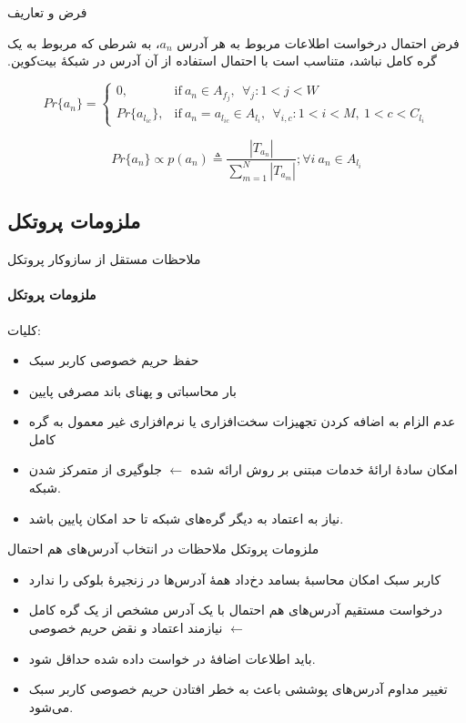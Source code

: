 \documentclass{beamer}
\begin{document}
\begin{frame}{فرض و تعاریف}
	\begin{block}{فرض}
		‫احتمال درخواست اطلاعات مربوط به هر آدرس $a_n$، به شرطی که مربوط به یک گره کامل نباشد، متناسب است با احتمال استفاده از آن آدرس در شبکهٔ بیت‌کوین.
	\end{block}

\begin{equation}
Pr\{{a_n}\} = 
\begin{cases}
0, & \text{if}\ a_n \in A_{f_j},\ \ \forall_{j} : 1<j<W \\
Pr\{{a_{l_{ic}}}\}, & \text{if}\ a_n = a_{l_{ic}} \in A_{l_i},\ \ \forall_{i,c} : 1<i<M,\  1<c<C_{l_i}
\end{cases} \label{eq:3}
\end{equation}


\begin{equation}
Pr\{{a_n}\} \propto p(a_n) \triangleq \frac{|T_{a_n}|}{\sum_{m=1}^{N}|T_{a_m}|}; \forall i \  a_n \in A_{l_i}  \label{eq:4}
\end{equation}

\end{frame}


\subsection{ملزومات پروتکل}
\begin{frame}{ملاحظات مستقل از سازوکار پروتکل}
	\framesubtitle{ملزومات پروتکل}
	کلیات:
	\begin{itemize}
		\item {حفظ حریم خصوصی کاربر سبک}
		\item {بار محاسباتی و پهنای باند مصرفی پایین}
		\item {عدم الزام به اضافه کردن تجهیزات سخت‌افزاری یا نرم‌افزاری غیر معمول به گره کامل}
		\item {
			امکان سادهٔ ارائهٔ خدمات مبتنی بر روش ارائه شده $\leftarrow$ جلوگیری از متمرکز شدن شبکه.}
		\item {نیاز به اعتماد به دیگر گره‌های شبکه تا حد امکان پایین باشد.}
	\end{itemize}
\end{frame}

\begin{frame}{ملزومات پروتکل}
	ملاحظات در انتخاب آدرس‌های هم احتمال
	\begin{itemize}
		\item کاربر سبک امکان محاسبهٔ بسامد دخ‌داد همهٔ آدرس‌ها در زنجیرهٔ بلوکی را ندارد
		\item {%
			 درخواست مستقیم آدرس‌های هم احتمال با یک آدرس مشخص از یک گره کامل $\leftarrow$ نیازمند اعتماد و نقض حریم خصوصی}
		 \item {%
		 باید اطلاعات اضافه‌ٔ در خواست داده شده حداقل شود.}
		 \item {%
		 تغییر مداوم آدرس‌های پوششی باعث به خطر افتادن حریم خصوصی کاربر سبک می‌شود.}
	\end{itemize}
\end{frame}
\end{document}
